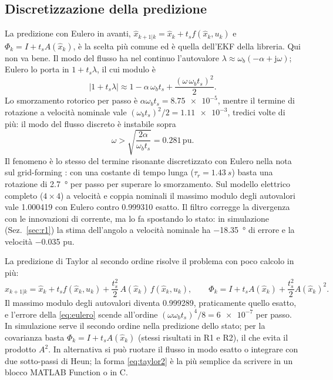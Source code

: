 \documentclass[10pt,a4paper]{scrartcl}
\newcommand{\jj}{\mathrm{j}}
\newcommand{\ts}{t_s}
\newcommand{\wb}{\omega_b}
\newcommand{\taur}{\tau_r}
\newcommand{\xh}{\hat{x}}
\newcommand{\pu}{\,\mathrm{pu}}
\begin{document}
\begin{onehalfspace}
\subsection{Discretizzazione della predizione}
\label{sec:discretizzazione}

La predizione con Eulero in avanti, $\xh_{k+1|k} = \xh_k + \ts f(\xh_k, u_k)$ e $\Phi_k = I + \ts A(\xh_k)$, è la scelta più comune ed è quella dell'EKF della libreria. Qui non va bene. Il modo del flusso ha nel continuo l'autovalore $\lambda \approx \wb(-\alpha + \jj\omega)$; Eulero lo porta in $1 + \ts\lambda$, il cui modulo è
\begin{equation}
\left|1 + \ts\lambda\right| \approx 1 - \alpha\,\wb\ts + \frac{(\omega\,\wb\ts)^2}{2}.
\label{eq:eulero}
\end{equation}
Lo smorzamento rotorico per passo è $\alpha\wb\ts = \num{8.75e-5}$, mentre il termine di rotazione a velocità nominale vale $(\wb\ts)^2/2 = \num{1.11e-3}$, tredici volte di più: il modo del flusso discreto è instabile sopra
\begin{equation}
\omega > \sqrt{\frac{2\alpha}{\wb\ts}} = \num{0.281}\pu .
\label{eq:wcrit}
\end{equation}
Il fenomeno è lo stesso del termine risonante discretizzato con Eulero nella nota sul grid-forming \cite{pwrgfm}: con una costante di tempo lunga ($\taur = \SI{1.43}{s}$) basta una rotazione di \SI{2.7}{\degree} per passo per superare lo smorzamento. Sul modello elettrico completo ($4\times4$) a velocità e coppia nominali il massimo modulo degli autovalori vale \num{1.000419} con Eulero contro \num{0.999310} esatto. Il filtro corregge la divergenza con le innovazioni di corrente, ma lo fa spostando lo stato: in simulazione (Sez.~\ref{sec:r1}) la stima dell'angolo a velocità nominale ha \SI{-18.35}{\degree} di errore e la velocità \num{-0.035} pu.

La predizione di Taylor al secondo ordine risolve il problema con poco calcolo in più:
\begin{equation}
\xh_{k+1|k} = \xh_k + \ts f(\xh_k,u_k) + \frac{\ts^2}{2}\,A(\xh_k)\,f(\xh_k,u_k), \qquad \Phi_k = I + \ts A(\xh_k) + \frac{\ts^2}{2}A(\xh_k)^2.
\label{eq:taylor2}
\end{equation}
Il massimo modulo degli autovalori diventa \num{0.999289}, praticamente quello esatto, e l'errore della \eqref{eq:eulero} scende all'ordine $(\omega\wb\ts)^4/8 = \num{6e-7}$ per passo. In simulazione serve il secondo ordine nella predizione dello stato; per la covarianza basta $\Phi_k = I + \ts A(\xh_k)$ (stessi risultati in R1 e R2), il che evita il prodotto $A^2$. In alternativa si può ruotare il flusso in modo esatto o integrare con due sotto-passi di Heun; la forma \eqref{eq:taylor2} è la più semplice da scrivere in un blocco MATLAB Function o in C.


\end{onehalfspace}
\end{document}
